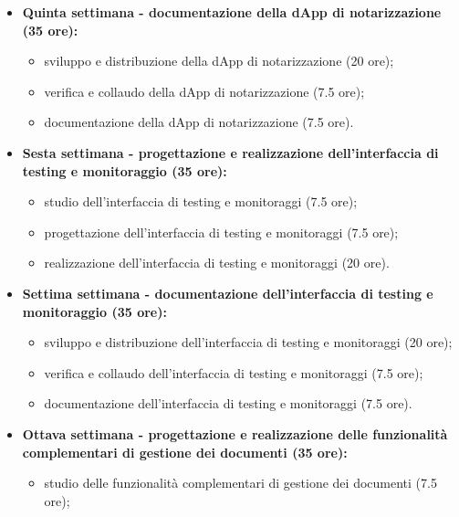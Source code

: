 {\begin{itemize}
\begin{itemize}
            \item progettazione della dApp di notarizzazione (7.5 ore);
            \item realizzazione della dApp di notarizzazione (20 ore).
        \end{itemize}
        \item \textbf{Quinta settimana - documentazione della dApp di notarizzazione (35 ore):} 
        \begin{itemize}
            \item sviluppo e distribuzione della dApp di notarizzazione (20 ore);
            \item verifica e collaudo della dApp di notarizzazione (7.5 ore);
            \item documentazione della dApp di notarizzazione (7.5 ore).
        \end{itemize}
        \item \textbf{Sesta settimana - progettazione e realizzazione dell'interfaccia di testing e monitoraggio (35 ore):} 
        \begin{itemize}
            \item studio dell'interfaccia di testing e monitoraggi (7.5 ore);
            \item progettazione dell'interfaccia di testing e monitoraggi (7.5 ore);
            \item realizzazione dell'interfaccia di testing e monitoraggi (20 ore).
        \end{itemize}
        \newpage
        \item \textbf{Settima settimana - documentazione dell'interfaccia di testing e monitoraggio (35 ore):} 
        \begin{itemize}
            \item sviluppo e distribuzione dell'interfaccia di testing e monitoraggi (20 ore);
            \item verifica e collaudo dell'interfaccia di testing e monitoraggi (7.5 ore);
            \item documentazione dell'interfaccia di testing e monitoraggi (7.5 ore).
        \end{itemize}
        \item \textbf{Ottava settimana - progettazione e realizzazione delle funzionalità complementari di gestione dei documenti (35 ore):} 
        \begin{itemize}
            \item studio delle funzionalità complementari di gestione dei documenti (7.5 ore);

\end{itemize}
\end{itemize}}
